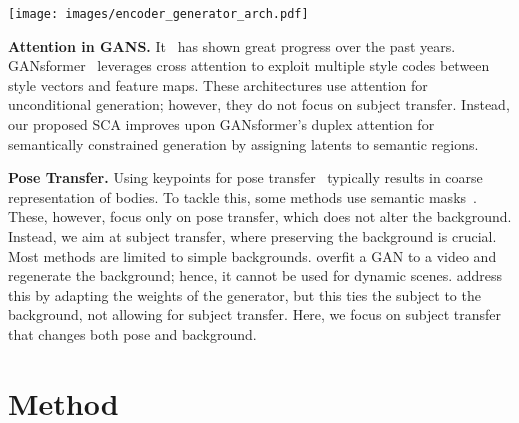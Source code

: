 \documentclass[runningheads]{llncs}
\makeatletter
\newcommand{\mname}{SCAM\@\xspace}
\makeatother
\begin{document}
\begin{figure*}[t!]
    \centering
\texttt{[image: images/encoder\_generator\_arch.pdf]}
     \caption{
     \small{\textbf{Training setup of the proposed \mname architecture}. 
     It consists of the SAT-Encoder (pink) and the SCAM-Generator (yellow). 
The SAT-Encoder allows the latents to retrieve information from an image, exploiting both the raw image and the convolution feature maps. Once the image is encoded, the latents are fed to the SCAM-Generator, which captures top-down and bottom-up interactions with a semantic constraint, allowing to easily alter the desired regions thanks to the latents that are dedicated to a given region.
     }}
    \label{fig:arch}
\end{figure*}


\noindent \textbf{Attention in GANS.} It~\cite{zhang2019selfattention,esser2021taming,jiang2021transgan,zhao2021improved,lee2021vitgan,zhang2021styleswin} has shown great progress over the past years.
GANsformer~\cite{hudson2021generative} leverages cross attention to exploit multiple style codes between style vectors and feature maps. 
These  architectures use attention for unconditional generation; however, they do not focus on  subject transfer. 
Instead, our proposed SCA improves upon GANsformer's duplex attention for semantically constrained generation by assigning latents to semantic regions.

\noindent \textbf{Pose Transfer.} 
Using keypoints for pose transfer~\cite{ma2017pose,zhu2019progressive,tang2020xinggan,li2020pona} typically results in coarse representation of bodies. 
To tackle this, some methods use semantic masks~\cite{han2019clothflow,dong2018soft,zhang2020human,zhang2021pise}. These, however, focus only on pose transfer, which does not alter the background. Instead, we aim at subject transfer, where preserving the background is crucial. 
Most methods are limited to simple backgrounds. \cite{chan2019everybody} overfit a GAN to a video and regenerate the background; hence, it cannot be used for dynamic scenes. \cite{wang2018fewshotvid2vid} address this by adapting the weights of the generator, but this ties the subject to the background, not allowing for subject transfer. Here, we focus on subject transfer that changes both pose and background. 
\section{Method}
\label{sec:methods}
\end{document}
